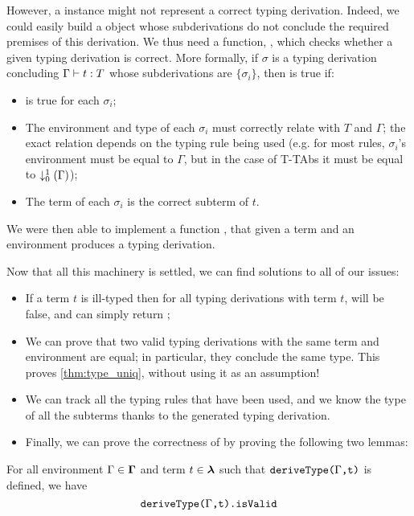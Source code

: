 However, a  instance might not represent a correct typing derivation. Indeed, we could easily build a  object whose subderivations do not conclude the required premises of this derivation.
We thus need a function, , which checks whether a given typing derivation is correct. More formally, if $\sigma$ is a typing derivation concluding $\Gamma \vdash{} t : {T}$ whose subderivations are $\{\sigma_i\}$, then  is true if:
\begin{itemize}
    \item {} is true for each $\sigma_i$;
    \item The environment and type of each $\sigma_i$ must correctly relate with $T$ and $\Gamma$;
    the exact relation depends on the typing rule being used
    (e.g. for most rules, $\sigma_i$'s environment must be equal to $\Gamma$,
    but in the case of T-TAbs it must be equal to ${\downarrow^{1}_{0}\left({\Gamma}\right)}$);
    \item The term of each $\sigma_i$ is the correct subterm of $t$.
\end{itemize}
We were then able to implement a function , that given a term and an environment produces a typing derivation.

Now that all this machinery is settled, we can find solutions to all of our issues:
\begin{itemize}
    \item If a term $t$ is ill-typed then for all typing derivations with term $t$,  will be false, and  can simply return ;
    \item We can prove that two valid typing derivations with the same term and environment are equal; in particular, they conclude the same type. 
    This proves \cref{thm:type_uniq}, without using it as an assumption!
    \item We can track all the typing rules that have been used, and we know the type of all the subterms thanks to the generated typing derivation.
    \item Finally, we can prove the correctness of 
    by proving the following two lemmas:
\end{itemize} 

\begin{lemma}\label{thm:td_sound}
    For all environment $\Gamma \in \bm\Gamma$ and term $t \in \bm\lambda$
    such that $\texttt{deriveType($\Gamma$,t)}$ is defined, we have
    \[ \texttt{deriveType($\Gamma$,t).isValid} \]
\end{lemma}

